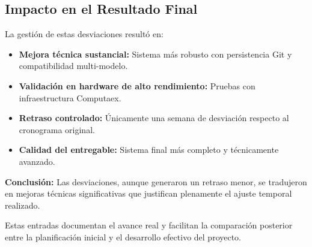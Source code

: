 \documentclass[12pt,a4paper]{article}
\begin{document}
\subsection{Impacto en el Resultado Final}

La gestión de estas desviaciones resultó en:
\begin{itemize}
    \item \textbf{Mejora técnica sustancial:} Sistema más robusto con persistencia Git y compatibilidad multi-modelo.
    \item \textbf{Validación en hardware de alto rendimiento:} Pruebas con infraestructura Computaex.
    \item \textbf{Retraso controlado:} Únicamente una semana de desviación respecto al cronograma original.
    \item \textbf{Calidad del entregable:} Sistema final más completo y técnicamente avanzado.
\end{itemize}

\textbf{Conclusión:} Las desviaciones, aunque generaron un retraso menor, se tradujeron en mejoras técnicas significativas que justifican plenamente el ajuste temporal realizado.

Estas entradas documentan el avance real y facilitan la comparación posterior entre la planificación inicial y el desarrollo efectivo del proyecto.
\end{document}
